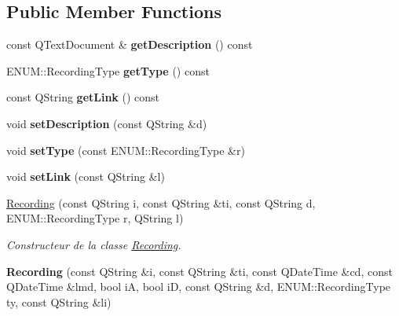 \subsection*{Public Member Functions}
\begin{DoxyCompactItemize}
\item 
\mbox{\label{class_recording_a4e0e357b15bf6409148f44ddb8ecd19b}} 
const Q\+Text\+Document \& {\bfseries get\+Description} () const
\item 
\mbox{\label{class_recording_a60a269e2cb74dd0b1e3781580d22bdcc}} 
E\+N\+U\+M\+::\+Recording\+Type {\bfseries get\+Type} () const
\item 
\mbox{\label{class_recording_afccf7d9ec99810c4b4a7f348069e5760}} 
const Q\+String {\bfseries get\+Link} () const
\item 
\mbox{\label{class_recording_ac00ad5d97ab59f489bcb20ea68316fa4}} 
void {\bfseries set\+Description} (const Q\+String \&d)
\item 
\mbox{\label{class_recording_a4c2d04de136f59e122bc05c8c581a550}} 
void {\bfseries set\+Type} (const E\+N\+U\+M\+::\+Recording\+Type \&r)
\item 
\mbox{\label{class_recording_aa8c715e910a52614d836a4ea8572bd20}} 
void {\bfseries set\+Link} (const Q\+String \&l)
\item 
\hyperlink{class_recording_a2e3359660cd7573807fb46c15daf4e78}{Recording} (const Q\+String i, const Q\+String \&ti, const Q\+String d, E\+N\+U\+M\+::\+Recording\+Type r, Q\+String l)
\begin{DoxyCompactList}\small\item\em Constructeur de la classe \hyperlink{class_recording}{Recording}. \end{DoxyCompactList}\item 
\mbox{\label{class_recording_a93af6ebb8ec5ae00ac85679756c82049}} 
{\bfseries Recording} (const Q\+String \&i, const Q\+String \&ti, const Q\+Date\+Time \&cd, const Q\+Date\+Time \&lmd, bool iA, bool iD, const Q\+String \&d, E\+N\+U\+M\+::\+Recording\+Type ty, const Q\+String \&li)
\item 
\mbox{\label{class_recording_ab354d60b8ecb06699378a849f6143ac6}} 

\end{DoxyCompactItemize}
